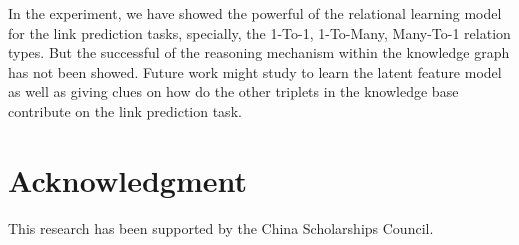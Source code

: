 \documentclass[10pt,journal]{IEEEtran}
\begin{document}
In the experiment, we have showed the powerful of the relational learning model for the link prediction tasks, specially, the 1-To-1, 1-To-Many, Many-To-1 relation types. But the successful of the reasoning mechanism within the knowledge graph has not been showed. Future work might study to learn the latent feature model as well as giving clues on how do the other triplets in the knowledge base contribute on the link prediction task.

\section*{Acknowledgment}
This research has been supported by the China Scholarships Council.



\end{document}

